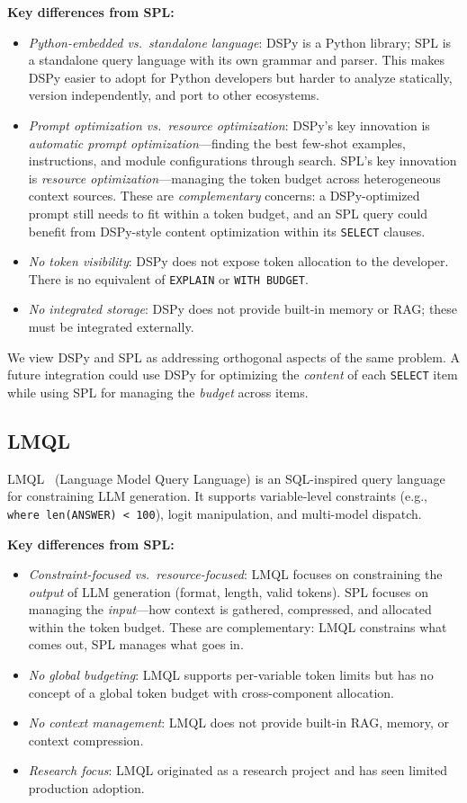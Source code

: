 \documentclass[11pt,a4paper]{article}
\begin{document}
\textbf{Key differences from SPL:}
\begin{itemize}[nosep]
  \item \emph{Python-embedded vs.\ standalone language}: DSPy is a Python library; SPL is a standalone query language with its own grammar and parser. This makes DSPy easier to adopt for Python developers but harder to analyze statically, version independently, and port to other ecosystems.
  \item \emph{Prompt optimization vs.\ resource optimization}: DSPy's key innovation is \emph{automatic prompt optimization}---finding the best few-shot examples, instructions, and module configurations through search. SPL's key innovation is \emph{resource optimization}---managing the token budget across heterogeneous context sources. These are \emph{complementary} concerns: a DSPy-optimized prompt still needs to fit within a token budget, and an SPL query could benefit from DSPy-style content optimization within its \texttt{SELECT} clauses.
  \item \emph{No token visibility}: DSPy does not expose token allocation to the developer. There is no equivalent of \texttt{EXPLAIN} or \texttt{WITH BUDGET}.
  \item \emph{No integrated storage}: DSPy does not provide built-in memory or RAG; these must be integrated externally.
\end{itemize}

We view DSPy and SPL as addressing orthogonal aspects of the same problem. A future integration could use DSPy for optimizing the \emph{content} of each \texttt{SELECT} item while using SPL for managing the \emph{budget} across items.

\subsection{LMQL}

LMQL~\citep{beurer2023prompting} (Language Model Query Language) is an SQL-inspired query language for constraining LLM generation. It supports variable-level constraints (e.g., \texttt{where len(ANSWER) < 100}), logit manipulation, and multi-model dispatch.

\textbf{Key differences from SPL:}
\begin{itemize}[nosep]
  \item \emph{Constraint-focused vs.\ resource-focused}: LMQL focuses on constraining the \emph{output} of LLM generation (format, length, valid tokens). SPL focuses on managing the \emph{input}---how context is gathered, compressed, and allocated within the token budget. These are complementary: LMQL constrains what comes out, SPL manages what goes in.
  \item \emph{No global budgeting}: LMQL supports per-variable token limits but has no concept of a global token budget with cross-component allocation.
  \item \emph{No context management}: LMQL does not provide built-in RAG, memory, or context compression.
  \item \emph{Research focus}: LMQL originated as a research project and has seen limited production adoption.
\end{itemize}
\end{document}

